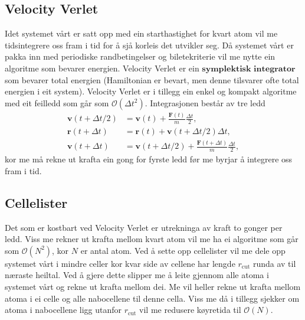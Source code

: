 \documentclass[12pt, a4paper]{article}
\theoremstyle{definition}
\newcommand{\vb}{\mathbf}
\begin{document}
    \subsection*{Velocity Verlet}
        Idet systemet vårt er satt opp med ein starthastighet for kvart atom vil me tidsintegrere oss fram i tid for å sjå korleis det utvikler seg. Då systemet vårt er pakka
        inn med periodiske randbetingelser og biletekriterie vil me nytte ein algoritme som bevarer energien. Velocity Verlet er ein $\textbf{symplektisk integrator}$ som 
        bevarer total energien (Hamiltonian er bevart, men denne tilsvarer ofte total energien i eit system). Velocity Verlet er i tillegg ein enkel og kompakt algoritme med
        eit feilledd som går som $\mathcal{O}(\Delta t^2)$. Integrasjonen består av tre ledd
        \begin{align*}
            \vb{v}(t + \Delta t/2) &= \vb{v}(t) + \frac{\vb{F}(t)}{m}\frac{\Delta t}{2}, \\
            \vb{r}(t + \Delta t) &= \vb{r}(t) + \vb{v}(t + \Delta t/2)\Delta t, \\
            \vb{v}(t + \Delta t) &= \vb{v}(t + \Delta t/2) + \frac{\vb{F}(t + \Delta t)}{m}\frac{\Delta t}{2},
        \end{align*}
        kor me må rekne ut krafta ein gong for fyrste ledd før me byrjar å integrere oss fram i tid.

    \subsection*{Cellelister}
        Det som er kostbart ved Velocity Verlet er utrekninga av kraft to gonger per ledd. Viss me rekner ut krafta mellom kvart atom vil me ha ei algoritme som går som
        $\mathcal{O}(N^2)$, kor $N$ er antal atom. Ved å sette opp cellelister vil me dele opp systemet vårt i mindre celler kor kvar side av cellene har lengde 
        $r_{\text{cut}}$ runda av til næraste heiltal. Ved å gjere dette slipper me å leite gjennom alle atoma i systemet vårt og rekne ut krafta mellom dei. Me vil 
        heller rekne ut krafta mellom atoma i ei celle og alle nabocellene til denne cella. Viss me då i tillegg sjekker om atoma i nabocellene ligg utanfor
        $r_{\text{cut}}$ vil me redusere køyretida til $\mathcal{O}(N)$.
\end{document}
